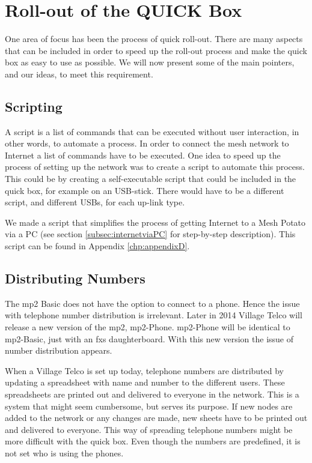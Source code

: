 \chapter{Roll-out of the QUICK Box}
\label{chp:manuals} 

One area of focus has been the process of quick roll-out. There are many aspects that can be included in order to speed up the roll-out process and make the \gls{quick} box as easy to use as possible. We will now present some of the main pointers, and our ideas, to meet this requirement.


\section{Scripting}
A script is a list of commands that can be executed without user interaction, in other words, to automate a process. In order to connect the mesh network to Internet a list of commands have to be executed. One idea to speed up the process of setting up the network was to create a script to automate this process. This could be by creating a self-executable script that could be included in the \gls{quick} box, for example on an USB-stick. There would have to be a different script, and different USBs, for each up-link type. 

We made a script that simplifies the process of getting Internet to a Mesh Potato via a PC (see section \ref{subsec:internetviaPC} for step-by-step description). This script can be found in Appendix \ref{chp:appendixD}. 

\section{Distributing Numbers}
The \gls{mp2} Basic does not have the option to connect to a phone. Hence the issue with telephone number distribution is irrelevant. Later in 2014 Village Telco will release a new version of the \gls{mp2}, \gls{mp2}-Phone. \gls{mp2}-Phone will be identical to \gls{mp2}-Basic, just with an \gls{fxs} daughterboard. With this new version the issue of number distribution appears. 

When a Village Telco is set up today, telephone numbers are distributed by updating a spreadsheet with name and number to the different users. These spreadsheets are printed out and delivered to everyone in the network. This is a system that might seem cumbersome, but serves its purpose. If new nodes are added to the network or any changes are made, new sheets have to be printed out and delivered to everyone. This way of spreading telephone numbers might be more difficult with the \gls{quick} box. Even though the numbers are predefined, it is not set who is using the phones.  

